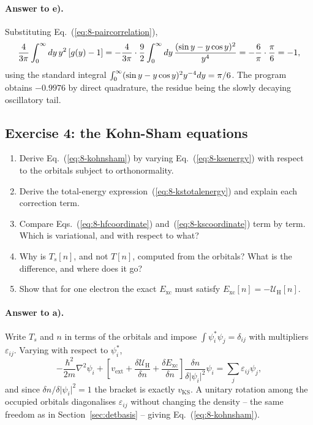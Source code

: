\paragraph{Answer to e).}
Substituting Eq.~(\ref{eq:8-paircorrelation}),
\begin{equation}
  \frac{4}{3\pi}\int_0^{\infty}dy\,y^2\left[g(y)-1\right]
   = -\frac{4}{3\pi}\cdot\frac{9}{2}
     \int_0^{\infty}dy\,\frac{(\sin y-y\cos y)^2}{y^4}
   = -\frac{6}{\pi}\cdot\frac{\pi}{6} = -1,
  \label{eq:8-exe3}
\end{equation}
using the standard integral
$\int_0^{\infty}(\sin y-y\cos y)^2y^{-4}dy=\pi/6$.  The program obtains
$-0.9976$ by direct quadrature, the residue being the slowly decaying
oscillatory tail.

\subsection*{Exercise 4: the Kohn-Sham equations}
\label{ex:8-kohnsham}

\begin{enumerate}
  \item[a)] Derive Eq.~(\ref{eq:8-kohnsham}) by varying
  Eq.~(\ref{eq:8-ksenergy}) with respect to the orbitals subject to
  orthonormality.
  \item[b)] Derive the total-energy expression~(\ref{eq:8-kstotalenergy}) and
  explain each correction term.
  \item[c)] Compare Eqs.~(\ref{eq:8-hfcoordinate})
  and~(\ref{eq:8-kscoordinate}) term by term.  Which is variational, and with
  respect to what?
  \item[d)] Why is $T_s[n]$, and not $T[n]$, computed from the orbitals?
  What is the difference, and where does it go?
  \item[e)] Show that for one electron the exact $E_{\mathrm{xc}}$ must
  satisfy $E_{\mathrm{xc}}[n]=-\mathcal{U}_{\mathrm{H}}[n]$.
\end{enumerate}

\paragraph{Answer to a).}
Write $T_s$ and $n$ in terms of the orbitals and impose
$\int\psi_i^{*}\psi_j=\delta_{ij}$ with multipliers $\varepsilon_{ij}$.
Varying with respect to $\psi_i^{*}$,
\begin{equation}
  -\frac{\hbar^2}{2m}\nabla^2\psi_i
  + \left[v_{\mathrm{ext}}
    + \frac{\delta\mathcal{U}_{\mathrm{H}}}{\delta n}
    + \frac{\delta E_{\mathrm{xc}}}{\delta n}\right]
    \frac{\delta n}{\delta\vert\psi_i\vert^2}\psi_i
  = \sum_j\varepsilon_{ij}\psi_j ,
  \label{eq:8-exa4}
\end{equation}
and since $\delta n/\delta\vert\psi_i\vert^2=1$ the bracket is exactly
$v_{\mathrm{KS}}$.  A unitary rotation among the occupied orbitals
diagonalises $\varepsilon_{ij}$ without changing the density -- the same
freedom as in Section~\ref{sec:detbasis} -- giving
Eq.~(\ref{eq:8-kohnsham}).

